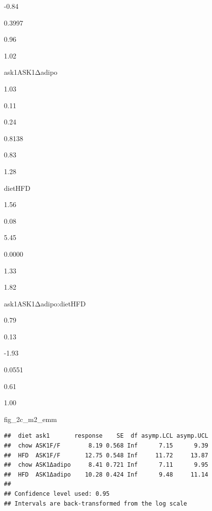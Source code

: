 \documentclass[]{book}
\newenvironment{Shaded}{\begin{snugshade}}{\end{snugshade}}
\newcommand{\DataTypeTok}[1]{\textcolor[rgb]{0.13,0.29,0.53}{#1}}
\newcommand{\KeywordTok}[1]{\textcolor[rgb]{0.13,0.29,0.53}{\textbf{#1}}}
\newcommand{\NormalTok}[1]{#1}
\newcommand{\OperatorTok}[1]{\textcolor[rgb]{0.81,0.36,0.00}{\textbf{#1}}}
\newcommand{\OtherTok}[1]{\textcolor[rgb]{0.56,0.35,0.01}{#1}}
\newcommand{\StringTok}[1]{\textcolor[rgb]{0.31,0.60,0.02}{#1}}
\begin{document}
-0.84

0.3997

0.96

1.02

ask1ASK1Δadipo

1.03

0.11

0.24

0.8138

0.83

1.28

dietHFD

1.56

0.08

5.45

0.0000

1.33

1.82

ask1ASK1Δadipo:dietHFD

0.79

0.13

-1.93

0.0551

0.61

1.00

\begin{Shaded}
\end{Shaded}

\begin{Shaded}
\begin{Highlighting}[]
\NormalTok{fig_2c_m2_emm}
\end{Highlighting}
\end{Shaded}

\begin{verbatim}
##  diet ask1       response    SE  df asymp.LCL asymp.UCL
##  chow ASK1F/F        8.19 0.568 Inf      7.15      9.39
##  HFD  ASK1F/F       12.75 0.548 Inf     11.72     13.87
##  chow ASK1Δadipo     8.41 0.721 Inf      7.11      9.95
##  HFD  ASK1Δadipo    10.28 0.424 Inf      9.48     11.14
## 
## Confidence level used: 0.95 
## Intervals are back-transformed from the log scale
\end{verbatim}
\end{document}
